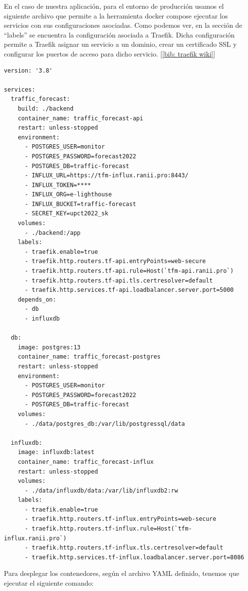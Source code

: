 \documentclass[a4paper, oneside, 12pt]{book}
\begin{document}
	\pagebreak
	
	\noindent En el caso de nuestra aplicación, para el entorno de producción usamos el siguiente archivo que permite a la herramienta docker compose ejecutar los servicios con sus configuraciones asociadas. Como podemos ver, en la sección de ``labels'' se encuentra la configuración asociada a Traefik. Dicha configuración permite a Traefik asignar un servicio a un dominio, crear un certificado SSL y configurar los puertos de acceso para dicho servicio. [\ref{bib: traefik wiki}]
	
	\begin{lstlisting}[style=yaml, caption={Archivo configuración de contenedores para entorno de producción.}]
version: '3.8'

services:
  traffic_forecast:
    build: ./backend
    container_name: traffic_forecast-api
    restart: unless-stopped
    environment:
      - POSTGRES_USER=monitor
      - POSTGRES_PASSWORD=forecast2022
      - POSTGRES_DB=traffic-forecast
      - INFLUX_URL=https://tfm-influx.ranii.pro:8443/
      - INFLUX_TOKEN=****
      - INFLUX_ORG=e-lighthouse
      - INFLUX_BUCKET=traffic-forecast
      - SECRET_KEY=upct2022_sk
    volumes:
      - ./backend:/app
    labels:
      - traefik.enable=true
      - traefik.http.routers.tf-api.entryPoints=web-secure
      - traefik.http.routers.tf-api.rule=Host(`tfm-api.ranii.pro`)
      - traefik.http.routers.tf-api.tls.certresolver=default
      - traefik.http.services.tf-api.loadbalancer.server.port=5000
    depends_on:
      - db
      - influxdb

  db:
    image: postgres:13
    container_name: traffic_forecast-postgres
    restart: unless-stopped
    environment:
      - POSTGRES_USER=monitor
      - POSTGRES_PASSWORD=forecast2022
      - POSTGRES_DB=traffic-forecast
    volumes:
      - ./data/postgres_db:/var/lib/postgressql/data

  influxdb:
    image: influxdb:latest
    container_name: traffic_forecast-influx
    restart: unless-stopped
    volumes:
      - ./data/influxdb/data:/var/lib/influxdb2:rw
    labels:
      - traefik.enable=true
      - traefik.http.routers.tf-influx.entryPoints=web-secure
      - traefik.http.routers.tf-influx.rule=Host(`tfm-influx.ranii.pro`)
      - traefik.http.routers.tf-influx.tls.certresolver=default
      - traefik.http.services.tf-influx.loadbalancer.server.port=8086
	\end{lstlisting} 

	\noindent Para desplegar los contenedores, según el archivo YAML definido, tenemos que ejecutar el siguiente comando: 
	
\end{document}

